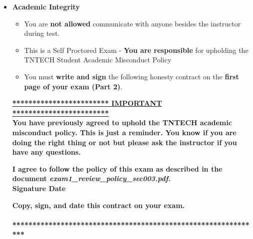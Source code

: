 \documentclass[11pt]{article}
\begin{document}
\begin{itemize}
\begin{itemize}
		\item \underline{You are {\bf not required} to print the exam.}

		\end{itemize}

\newpage
		\item  \textbf{ \Large Academic Integrity}
\begin{itemize}

		\item  You are {\bf not allowed} communicate with anyone besides the instructor during test. 
		\item This is a Self Proctored Exam - {\bf You are responsible} for upholding the TNTECH Student Academic Misconduct Policy
		\item  You must {\bf write and sign} the following honesty contract on the {\bf first page of your exam (Part 2)}. 

\end{itemize}


 {\R  \bf \underline{************************ IMPORTANT ************************}} \vspace{3mm}\\
			  {\R \bf You have previously agreed to uphold the TNTECH academic misconduct policy. This is just a reminder. You know if you are doing the right thing or not but please ask the instructor if you have any questions. }
\begin{framed}
	
	\vspace{3mm}	 \textbf{ I \underline{\hspace{50mm}} agree to follow the policy of this exam \vspc as described in the document {\it exam1\_review\_policy\_sec003.pdf}.  }\vspace{3mm}\\
		 \textbf{\Large Signature \underline{\hspace{80mm}} Date\underline{\hspace{20mm} }}\\

\end{framed}
			{\R  \bf Copy, sign, and date this contract on your exam. }   \vspace{1mm}\\
			{\R  \bf \underline{\hspace{140mm}}} \\
			{\R  \bf ***************************************************************} 

\newpage


\end{itemize}
\end{document}
